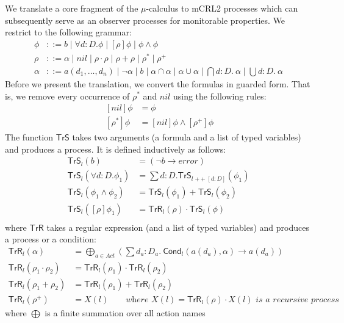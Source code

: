\documentclass[letter]{llncs}
\newcommand{\Tr}{\ensuremath{\mathsf{TrS}}}
\newcommand{\TrR}{\ensuremath{\mathsf{TrR}}}
\newcommand{\TrA}{\ensuremath{\mathsf{Cond}}}
\newcommand{\concat}{\ensuremath{\mathop{+\!\!+}}}
\begin{document}
We translate a core fragment of the $\mu$-calculus to mCRL2 processes which
can subsequently serve as an observer processes for monitorable properties.
We restrict to the following grammar:
\vspace{-7 pt}
\[
\begin{array}{ll}
\phi & ::= b \mid \forall d{:}D.\phi \mid [\rho]\phi \mid \phi\wedge \phi\\
\rho & ::= \alpha \mid nil \mid \rho\cdot \rho \mid
              \rho+\rho \mid
              \rho^* \mid \rho^+ \\
\alpha & ::=  a(d_1,\dots,d_n) \mid \neg \alpha \mid b \mid
              \alpha \cap \alpha \mid \alpha \cup \alpha \mid
              \bigcap d{:}D.~\alpha \mid \bigcup d{:}D.~\alpha
\end{array}
\]
Before we present the translation, we convert the formulas in
guarded form. That is, we remove every occurrence of $\rho^*$ and $nil$ using
the following rules:
\[
\begin{array}{ll}
~
[nil]\phi &= \phi \\
~[\rho^*]\phi &= [nil]\phi \wedge [\rho^+]\phi
\end{array}
\]
The function $\Tr$ takes two arguments (a formula and a list of typed
variables) and produces a process. It is defined inductively as follows:
\[
\begin{array}{ll}
\Tr_l(b) &= (\neg b \to \textit{error}) \\
\Tr_l(\forall d:D.\phi_1) & = \sum d{:}D. \Tr_{l\concat [d:D]} (\phi_1) \\
\Tr_l(\phi_1 \wedge \phi_2) & = \Tr_l(\phi_1) + \Tr_l(\phi_2) \\
\Tr_l([\rho]\phi_1) & = \TrR_l(\rho) \cdot \Tr_l(\phi) \\
\end{array}
\]
where $\TrR$ takes a regular expression (and a list of typed variables)
and produces a process or a condition:
\[
\begin{array}{ll}
\TrR_l(\alpha) &= \bigoplus\limits_{a \in Act} (\sum d_a{:}D_a.~ \TrA_l(a(d_a),\alpha) \to a(d_a)) \\
\TrR_l(\rho_1 \cdot \rho_2) & = \TrR_l(\rho_1) \cdot \TrR_l(\rho_2) \\
\TrR_l(\rho_1 + \rho_2) &= \TrR_l(\rho_1) + \TrR_l(\rho_2) \\
\TrR_l(\rho^+) & = X(l) \qquad \textit{where $X(l) = \TrR_l(\rho)\cdot X(l)$ is
a recursive process} 
\end{array}
\]
where $\bigoplus$ is a finite summation over all action names
\end{document}
